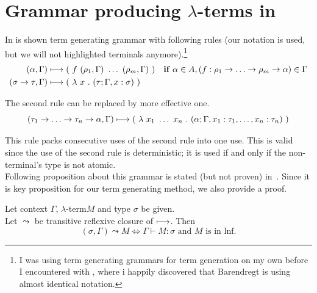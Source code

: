 \documentclass[12pt,a4paper]{report}
\newcommand{\lterm}{$\lambda$-term\xspace}
\newcommand{\lterms}{$\lambda$-terms\xspace}
\newcommand{\tur}[3]{#1\vdash{}#2:#3}
\begin{document}
\section{Grammar producing \lterms in \lnf}
\label{barlike}

In \cite{barendregt10} is shown term generating grammar with 
following rules (our notation is used, but we will not 
highlighted terminals anymore).\footnote{
I was using term generating grammars for term generation
on my own before I encountered with \cite{barendregt10},
where i happily discovered that Barendregt is using
almost identical notation.
}
\begin{align*}
( \alpha , \Gamma )  
&\gar
(~f~( \rho_1 , \Gamma )~\dots~( \rho_m , \Gamma )~)
& \textbf{if } \alpha \in A,
(f : \rho_1 \ar \dots \ar \rho_m \ar \alpha) \in \Gamma
\\ 
( \sigma \rightarrow \tau , \Gamma )  
&\gar
(~\lambda~x~.~( \tau ; \Gamma,x:\sigma )~)
&   
\end{align*}

The second rule can be replaced by more effective one.
\[ 
( \tau_1 \ar \dots \ar \tau_n \ar \alpha , \Gamma )  
\gar
(~\lambda~x_1~\dots~x_n~.~
( \alpha ; \Gamma , x_1:\tau_1 , \dots , x_n:\tau_n  )~)
\] 

This rule packs consecutive uses of the second rule into one use.
This is valid since the use of the second rule is deterministic;
it is used if and only if the non-terminal's type is not atomic.\\

Following proposition about this grammar is stated (but not proven)
in~\cite{barendregt10}. Since it is key proposition for our 
term generating method, we also provide a proof.


\newcommand{\garr}{\leadsto}%
\newcommand{\Gp}{\Gamma^\prime}

\begin{proposition}
Let context $\Gamma$, \lterm $M$ and type $\sigma$ be given.\\
Let $\garr$ be transitive reflexive closure of $\longmapsto$. 
Then
$$ 
(\sigma,\Gamma) \garr M 
\Leftrightarrow
\tur{\Gamma}{M}{\sigma} \text{ and $M$ is in lnf}.   
$$
\end{proposition}
\end{document}
